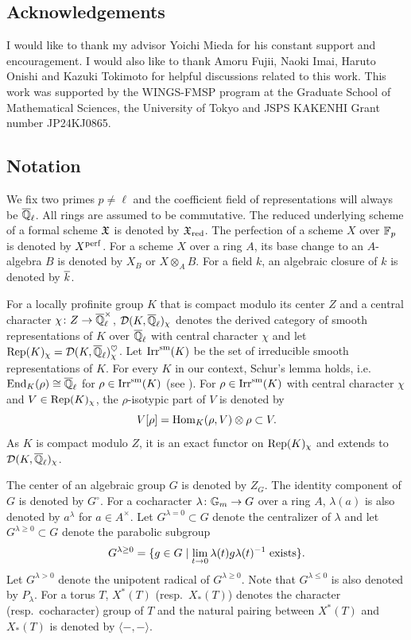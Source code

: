 \documentclass[12pt,reqno]{amsart}
\begin{document}
\subsection*{Acknowledgements}
I would like to thank my advisor Yoichi Mieda for his constant support and encouragement. I would also like to thank Amoru Fujii, Naoki Imai, Haruto Onishi and Kazuki Tokimoto for helpful discussions related to this work. This work was supported by the WINGS-FMSP program at the Graduate School of Mathematical Sciences, the University of Tokyo and JSPS KAKENHI Grant number JP24KJ0865.

\subsection*{Notation}

We fix two primes $p \neq \ell$ and the coefficient field of representations will always be ${\overline{\mathbb{Q}}_\ell}$. All rings are assumed to be commutative. The reduced underlying scheme of a formal scheme ${\mathfrak{X}}$ is denoted by ${\mathfrak{X}}_{\operatorname{red}}$. The perfection of a scheme $X$ over $\mathbb{F}_p$ is denoted by $X^{\mathrm{perf}}$. For a scheme $X$ over a ring $A$, its base change to an $A$-algebra $B$ is denoted by $X_B$ or $X\otimes_A B$. For a field $k$, an algebraic closure of $k$ is denoted by ${\overline{k}}$. 

For a locally profinite group $K$ that is compact modulo its center $Z$ and a central character $\chi \colon Z \to {\overline{\mathbb{Q}}_\ell^\times}$, ${\mathcal{D}}(K, {\overline{\mathbb{Q}}_\ell})_\chi$ denotes the derived category of smooth representations of $K$  over ${\overline{\mathbb{Q}}_\ell}$ with central character $\chi$ and let ${\operatorname{Rep}}(K)_\chi = {\mathcal{D}}(K, {\overline{\mathbb{Q}}_\ell})_\chi^\heartsuit$. Let ${\operatorname{Irr}}^{\operatorname{sm}}(K)$ be the set of irreducible smooth representations of $K$. For every $K$ in our context, Schur's lemma holds, i.e.\ ${\operatorname{End}}_K(\rho) \cong {\overline{\mathbb{Q}}_\ell}$ for $\rho \in {\operatorname{Irr}}^{\operatorname{sm}}(K)$ (see \cite[Section 2.6]{BH06}). For $\rho \in {\operatorname{Irr}}^{\operatorname{sm}}(K)$ with central character $\chi$ and $V \in {\operatorname{Rep}}(K)_\chi$, the $\rho$-isotypic part of $V$ is denoted by 
\[
    V[\rho] = {\operatorname{Hom}}_K(\rho, V) \otimes \rho \subset V. 
\]
As $K$ is compact modulo $Z$, it is an exact functor on ${\operatorname{Rep}}(K)_\chi$ and extends to ${\mathcal{D}}(K, {\overline{\mathbb{Q}}_\ell})_\chi$. 

The center of an algebraic group $G$ is denoted by $Z_G$. The identity component of $G$ is denoted by $G^\circ$. For a cocharacter $\lambda \colon \mathbb{G}_m \to G$ over a ring $A$, $\lambda(a)$ is also denoted by $a^\lambda$ for $a\in A^\times$. 
Let $G^{\lambda=0} \subset G$ denote the centralizer of $\lambda$ and let $G^{\lambda \geq 0} \subset G$ denote the parabolic subgroup
\[
	G^{\lambda \geq 0} = \{ g\in G \mid \lim_{t \to 0} \lambda(t) g \lambda(t)^{-1} \hspace{3pt} {\mathrm{exists}}\}. 
\]
Let $G^{\lambda > 0}$ denote the unipotent radical of $G^{\lambda \geq 0}$. Note that $G^{\lambda \leq 0}$ is also denoted by $P_\lambda$. For a torus $T$, $X^*(T)$ (resp.\ $X_*(T)$) denotes the character (resp.\ cocharacter) group of $T$ and the natural pairing between $X^*(T)$ and $X_*(T)$ is denoted by $\langle - , - \rangle$. 
\end{document}

